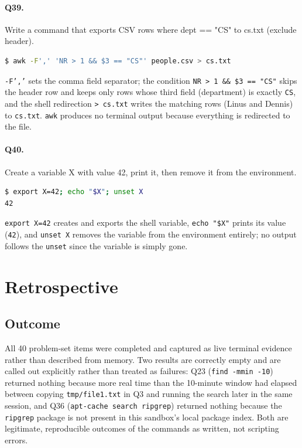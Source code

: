 \paragraph{Q39.} Write a command that exports CSV rows where dept == "CS" to cs.txt (exclude header).
\begin{lstlisting}[language=bash,caption={Q39 evidence: \texttt{awk -F',' 'NR > 1 \&\& \$3 == "CS"' people.csv > cs.txt}},label={Listing:Q39}]
$ awk -F',' 'NR > 1 && $3 == "CS"' people.csv > cs.txt
\end{lstlisting}
\texttt{-F','} sets the comma field separator; the condition \texttt{NR > 1 \&\& \$3 == "CS"} skips the header row and keeps only rows whose third field (department) is exactly \texttt{CS}, and the shell redirection \texttt{> cs.txt} writes the matching rows (Linus and Dennis) to \texttt{cs.txt}. \texttt{awk} produces no terminal output because everything is redirected to the file.

\paragraph{Q40.} Create a variable X with value 42, print it, then remove it from the environment.
\begin{lstlisting}[language=bash,caption={Q40 evidence: \texttt{export X=42; echo "\$X"; unset X}},label={Listing:Q40}]
$ export X=42; echo "$X"; unset X
42
\end{lstlisting}
\texttt{export X=42} creates and exports the shell variable, \texttt{echo "\$X"} prints its value (\texttt{42}), and \texttt{unset X} removes the variable from the environment entirely; no output follows the \texttt{unset} since the variable is simply gone.

\section{Retrospective}
\subsection{Outcome}
All 40 problem-set items were completed and captured as live terminal
evidence rather than described from memory. Two results are correctly empty
and are called out explicitly rather than treated as failures: Q23
(\texttt{find -mmin -10}) returned nothing because more real time than the
10-minute window had elapsed between copying \texttt{tmp/file1.txt} in Q3 and
running the search later in the same session, and Q36
(\texttt{apt-cache search ripgrep}) returned nothing because the
\texttt{ripgrep} package is not present in this sandbox's local package
index. Both are legitimate, reproducible outcomes of the commands as
written, not scripting errors.

